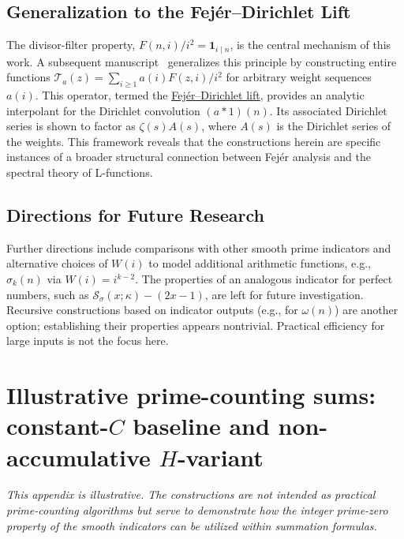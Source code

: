 \documentclass[11pt,a4paper]{amsart}
\theoremstyle{plain}
\theoremstyle{definition}
\theoremstyle{remark}
\begin{document}
\subsection{Generalization to the Fej\'er--Dirichlet Lift}
The divisor-filter property, $F(n,i)/i^2 = \mathbf{1}_{i\mid n}$, is the central mechanism of this work. A subsequent manuscript~\cite{fuchs2025-fejer} generalizes this principle by constructing entire functions $\mathcal{T}_a(z) = \sum_{i\ge1} a(i) F(z,i)/i^2$ for arbitrary weight sequences $a(i)$. This operator, termed the \href{https://arxiv.org/abs/2509.12297}{Fej\'er--Dirichlet lift}, provides an analytic interpolant for the Dirichlet convolution $(a*1)(n)$. Its associated Dirichlet series is shown to factor as $\zeta(s)A(s)$, where $A(s)$ is the Dirichlet series of the weights. This framework reveals that the constructions herein are specific instances of a broader structural connection between Fejér analysis and the spectral theory of L-functions.

\subsection{Directions for Future Research}
Further directions include comparisons with other smooth prime indicators and alternative choices of $W(i)$ to model additional arithmetic functions, e.g., $\sigma_k(n)$ via $W(i)=i^{k-2}$. The properties of an analogous indicator for perfect numbers, such as $\mathcal{S}_\sigma(x;\kappa)-(2x-1)$, are left for future investigation. Recursive constructions based on indicator outputs (e.g., for $\omega(n)$) are another option; establishing their properties appears nontrivial. Practical efficiency for large inputs is not the focus here.

\appendix

\section{Illustrative prime-counting sums: constant-$C$ baseline and non-accumulative $H$-variant}

\noindent\textit{This appendix is illustrative. The constructions are not intended as practical prime-counting algorithms but serve to demonstrate how the integer prime-zero property of the smooth indicators can be utilized within summation formulas.}
\end{document}
